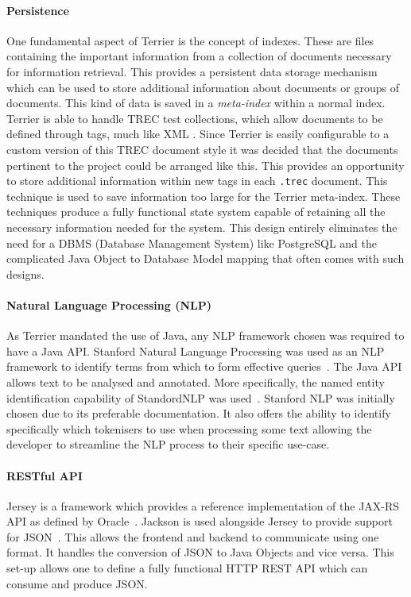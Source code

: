 \documentclass{l4proj}
\newcommand{\code}[1]{\texttt{#1}}
\begin{document}
\paragraph{Persistence}
One fundamental aspect of Terrier is the concept of indexes. These are files containing the important information from a collection of documents necessary for information retrieval. This provides a persistent data storage mechanism which can be used to store additional information about documents or groups of documents. This kind of data is saved in a \textit{meta-index} within a normal index.
Terrier is able to handle TREC test collections, which allow documents to be defined through tags, much like XML \cite{trecnist}.
Since Terrier is easily configurable to a custom version of this TREC document style it was decided that the documents pertinent to the project could be arranged like this.
This provides an opportunity to store additional information within new tags in each \code{.trec} document. This technique is used to save information too large for the Terrier meta-index.
These techniques produce a fully functional state system capable of retaining all the necessary information needed for the system.
This design entirely eliminates the need for a DBMS (Database Management System) like PostgreSQL and the complicated Java Object to Database Model mapping that often comes with such designs.

\paragraph{Natural Language Processing (NLP)}
As Terrier mandated the use of Java, any NLP framework chosen was required to have a Java API.
Stanford Natural Language Processing was used as an NLP framework to identify terms from which to form effective queries~\cite{manning-EtAl:2014:P14-5}. The Java API allows text to be analysed and annotated. More specifically, the named entity identification capability of StandordNLP was used~\cite{finkel2005incorporating}.
Stanford NLP was initially chosen due to its preferable documentation. It also offers the ability to identify specifically which tokenisers to use when processing some text allowing the developer to streamline the NLP process to their specific use-case.

\paragraph{RESTful API}
Jersey is a framework which provides a reference implementation of the JAX-RS API as defined by Oracle~\cite{jersey,jaxrsapi}.
Jackson is used alongside Jersey to provide support for JSON~\cite{jackson}. This allows the frontend and backend to communicate using one format. It handles the conversion of JSON to Java Objects and vice versa.
This set-up allows one to define a fully functional HTTP REST API which can consume and produce JSON.
\end{document}
